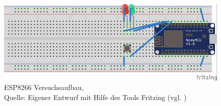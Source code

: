 \begin{figure}[!htb]
	\centering
	\includegraphics[scale=1.5]{ESP_Fritzing.jpg}
	\caption[ESP8266 Versuchsaufbau]{ESP8266 Versuchsaufbau,\\ Quelle: Eigener Entwurf mit Hilfe des Tools Fritzing (vgl. \cite{.fritz})}
\end{figure}
